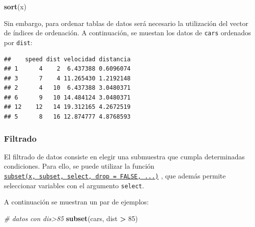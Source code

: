 \documentclass[
]{book}
\newenvironment{Shaded}{\begin{snugshade}}{\end{snugshade}}
\newcommand{\CommentTok}[1]{\textcolor[rgb]{0.56,0.35,0.01}{\textit{#1}}}
\newcommand{\DecValTok}[1]{\textcolor[rgb]{0.00,0.00,0.81}{#1}}
\newcommand{\FunctionTok}[1]{\textcolor[rgb]{0.13,0.29,0.53}{\textbf{#1}}}
\newcommand{\NormalTok}[1]{#1}
\newcommand{\OtherTok}[1]{\textcolor[rgb]{0.56,0.35,0.01}{#1}}
\newcommand{\SpecialCharTok}[1]{\textcolor[rgb]{0.81,0.36,0.00}{\textbf{#1}}}
\begin{document}
\begin{Shaded}
\begin{Highlighting}[]
\FunctionTok{sort}\NormalTok{(x)}
\end{Highlighting}
\end{Shaded}

Sin embargo, para ordenar tablas de datos será necesario la utilización del
vector de índices de ordenación. A continuación, se muestan los datos de \texttt{cars} ordenados por \texttt{dist}:

\begin{Shaded}
\end{Shaded}

\begin{verbatim}
##    speed dist velocidad distancia
## 1      4    2  6.437388 0.6096074
## 3      7    4 11.265430 1.2192148
## 2      4   10  6.437388 3.0480371
## 6      9   10 14.484124 3.0480371
## 12    12   14 19.312165 4.2672519
## 5      8   16 12.874777 4.8768593
\end{verbatim}

\subsubsection{Filtrado}\label{filtrado}

El filtrado de datos consiste en elegir una submuestra que cumpla determinadas condiciones. Para ello, se puede utilizar la función \href{https://www.rdocumentation.org/packages/base/versions/3.6.1/topics/subset}{\texttt{subset(x,\ subset,\ select,\ drop\ =\ FALSE,\ ...)}} , que además permite seleccionar variables con el argumento \texttt{select}.

A continuación se muestran un par de ejemplos:

\begin{Shaded}
\begin{Highlighting}[]
\CommentTok{\# datos con dis\textgreater{}85}
\FunctionTok{subset}\NormalTok{(cars, dist }\SpecialCharTok{\textgreater{}} \DecValTok{85}\NormalTok{) }
\end{Highlighting}
\end{Shaded}
\end{document}
